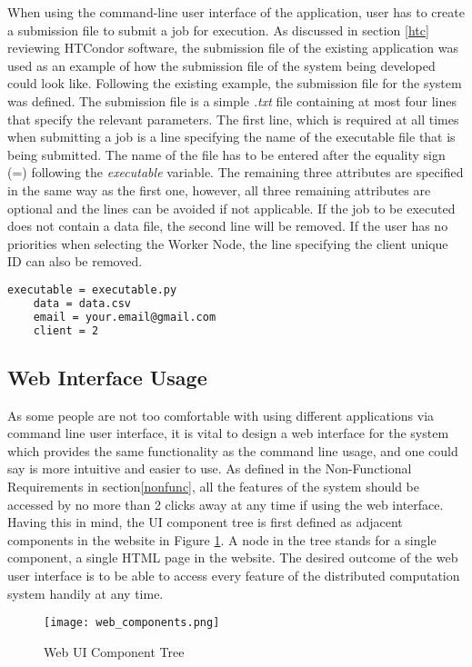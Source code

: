 \documentclass[10pt]{report}
\begin{document}
When using the command-line user interface of the application, user has to create a submission file to submit a job for execution. As discussed in section \ref{htc} reviewing HTCondor software, the submission file of the existing application was used as an example of how the submission file of the system being developed could look like. Following the existing example, the submission file for the system was defined. The submission file is a simple \textit{.txt} file containing at most four lines that specify the relevant parameters. The first line, which is required at all times when submitting a job is a line specifying the name of the executable file that is being submitted. The name of the file has to be entered after the equality sign (=) following the \textit{executable} variable. The remaining three attributes are specified in the same way as the first one, however, all three remaining attributes are optional and the lines can be avoided if not applicable. If the job to be executed does not contain a data file, the second line will be removed. If the user has no priorities when selecting the Worker Node, the line specifying the client unique ID can also be removed.

\begin{lstlisting}[language=sh]
    executable = executable.py
    data = data.csv
    email = your.email@gmail.com
    client = 2
\end{lstlisting}

\subsection{Web Interface Usage}

As some people are not too comfortable with using different applications via command line user interface, it is vital to design a web interface for the system which provides the same functionality as the command line usage, and one could say is more intuitive and easier to use. As defined in the Non-Functional Requirements in section\ref{nonfunc}, all the features of the system should be accessed by no more than 2 clicks away at any time if using the web interface. Having this in mind, the UI component tree is first defined as adjacent components in the website in Figure \ref{fig:webcomp}. A node in the tree stands for a single component, a single HTML page in the website. The desired outcome of the web user interface is to be able to access every feature of the distributed computation system handily at any time.

\begin{figure}[htp]
    \centering
    \texttt{[image: web\_components.png]}
    \caption{Web UI Component Tree}
    \label{fig:webcomp}
\end{figure}
\end{document}
